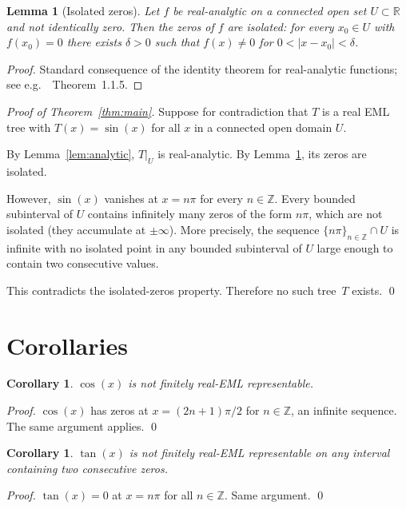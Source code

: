 \documentclass[11pt,a4paper]{amsart}
\newtheorem{corollary}[theorem]{Corollary}
\newtheorem{lemma}[theorem]{Lemma}
\newcommand{\R}{\mathbb{R}}
\newcommand{\Z}{\mathbb{Z}}
\begin{document}
\begin{lemma}[Isolated zeros]
  \label{lem:isolated}
  Let $f$ be real-analytic on a connected open set $U \subset \R$ and
  not identically zero.  Then the zeros of $f$ are isolated:
  for every $x_0 \in U$ with $f(x_0) = 0$ there exists $\delta > 0$
  such that $f(x) \neq 0$ for $0 < |x - x_0| < \delta$.
\end{lemma}

\begin{proof}
  Standard consequence of the identity theorem for real-analytic functions;
  see e.g.~\cite{krantz2002primer}~Theorem~1.1.5.
\end{proof}

\begin{proof}[Proof of Theorem~\ref{thm:main}]
  Suppose for contradiction that $T$ is a real EML tree with $T(x) = \sin(x)$
  for all $x$ in a connected open domain $U$.

  By Lemma~\ref{lem:analytic}, $T|_U$ is real-analytic.  By Lemma~\ref{lem:isolated},
  its zeros are isolated.

  However, $\sin(x)$ vanishes at $x = n\pi$ for every $n \in \Z$.
  Every bounded subinterval of $U$ contains infinitely many zeros of the form
  $n\pi$, which are not isolated (they accumulate at $\pm\infty$).
  More precisely, the sequence $\{n\pi\}_{n \in \Z} \cap U$ is infinite with
  no isolated point in any bounded subinterval of $U$ large enough to contain
  two consecutive values.

  This contradicts the isolated-zeros property.  Therefore no such tree~$T$
  exists. \qed
\end{proof}

\section{Corollaries}

\begin{corollary}
  $\cos(x)$ is not finitely real-EML representable.
\end{corollary}
\begin{proof}
  $\cos(x)$ has zeros at $x = (2n+1)\pi/2$ for $n \in \Z$, an infinite sequence.
  The same argument applies. \qed
\end{proof}

\begin{corollary}
  $\tan(x)$ is not finitely real-EML representable on any interval containing
  two consecutive zeros.
\end{corollary}
\begin{proof}
  $\tan(x) = 0$ at $x = n\pi$ for all $n \in \Z$. Same argument. \qed
\end{proof}
\end{document}
